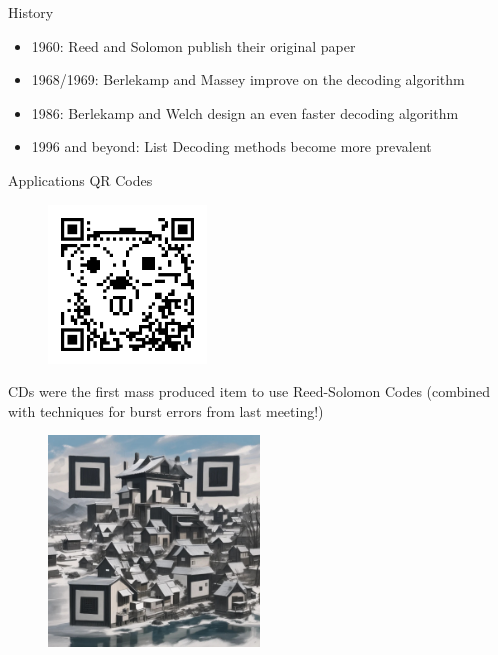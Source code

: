 \documentclass[aspectratio=169]{beamer}
\begin{document}
\begin{frame}{History}
    \begin{itemize}
        \item 1960: Reed and Solomon publish their original paper \cite{rs} \pause
        \item 1968/1969: Berlekamp and Massey improve on the decoding algorithm \cite{bm1, bm2} \pause
        \item 1986: Berlekamp and Welch design an even faster decoding algorithm \cite{bw} \pause
        \item 1996 and beyond: List Decoding methods become more prevalent 
    \end{itemize}
\end{frame}

\begin{frame}{Applications}
    QR Codes
    \begin{figure}
        \centering
        \includegraphics[width=0.375\textwidth]{qart1.png}
    \end{figure}\pause
    CDs were the first mass produced item to use Reed-Solomon Codes (combined with techniques for burst errors from last meeting!)
\end{frame}

\begin{frame}
    \begin{figure}
        \centering
        \includegraphics[width=0.5\textwidth]{ai.png}
    \end{figure}
\end{frame}
\end{document}
